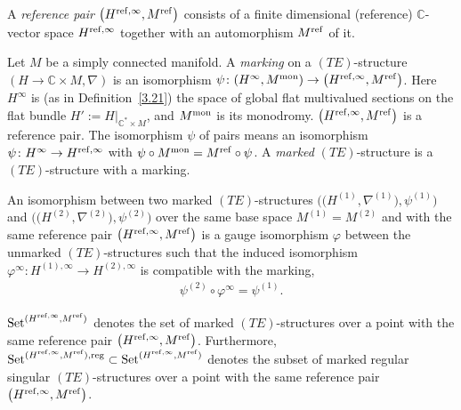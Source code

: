 \documentclass[10pt,a4paper]{amsart}
\numberwithin{equation}{section}
\numberwithin{figure}{section}
\newcommand{\C}{{\mathbb C}}
\newcommand{\nnn}{\nabla}
\begin{document}
\begin{Definition}\label{t3.25}\quad
\begin{enumerate}\itemsep=0pt
\item[$(a)$] A {\it reference pair} $\big(H^{{\rm ref},\infty},M^{\rm ref}\big)$
consists of a finite dimensional (reference)
$\C$-vector space $H^{{\rm ref},\infty}$
together with an automorphism $M^{\rm ref}$ of it.

\item[$(b)$] Let $M$ be a simply connected manifold.
A {\it marking} on a $(TE)$-structure
$(H\to\C\times M,\nnn)$ is an isomorphism
$\psi\colon (H^{\infty},M^{\rm mon})\to \big(H^{{\rm ref},\infty},M^{\rm ref}\big)$.
Here $H^{\infty}$ is (as in Definition~\ref{3.21})
the space of global flat multivalued sections
on the flat bundle $H':=H|_{\C^*\times M}$,
and $M^{\rm mon}$ is its monodromy.
$\big(H^{{\rm ref},\infty},M^{\rm ref}\big)$ is a reference pair.
The isomorphism $\psi$ of pairs means an isomorphism
$\psi\colon H^{\infty}\to H^{{\rm ref},\infty}$
with $\psi\circ M^{\rm mon}=M^{\rm ref}\circ\psi$.
A {\it marked} $(TE)$-structure is a $(TE)$-structure
with a marking.


{\sloppy\item[$(c)$] An isomorphism between two marked $(TE)$-structures
$\big(\big(H^{(1)},\nnn^{(1)}\big),\psi^{(1)}\big)$ and
$\big(\big(H^{(2)},\nnn^{(2)}\big),\psi^{(2)}\big)$ over the same base space
$M^{(1)}=M^{(2)}$ and with the same reference pair
$\big(H^{{\rm ref},\infty},M^{\rm ref}\big)$ is a gauge isomorphism $\varphi$
between the unmarked $(TE)$-structures such that
the induced isomorphism
$\varphi^{\infty}\colon H^{(1),\infty}\to H^{(2),\infty}$
is compatible with the marking,
\begin{gather*}%
\psi^{(2)}\circ\varphi^{\infty}=\psi^{(1)}.
\end{gather*}

}

\item[$(d)$] ${\rm Set}^{(H^{{\rm ref},\infty},M^{\rm ref})}$ denotes the set of
marked $(TE)$-structures over a point with the same reference
pair $\big(H^{{\rm ref},\infty},M^{\rm ref}\big)$. Furthermore,
${\rm Set}^{(H^{{\rm ref},\infty},M^{\rm ref}),{\rm reg}}\subset
{\rm Set}^{(H^{{\rm ref},\infty},M^{\rm ref})}$
denotes the subset of marked regular singular
$(TE)$-structures over a point with the same reference pair
$\big(H^{{\rm ref},\infty},M^{\rm ref}\big)$.
\end{enumerate}
\end{Definition}
\end{document}
